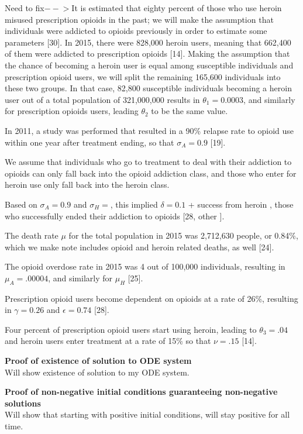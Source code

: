 \documentclass[12pt]{article}
\begin{document}
Need to fix$--$$>$It is estimated that eighty percent of those who use heroin misused prescription opioids in the past; we will make the assumption that individuals were addicted to opioids previously in order to estimate some parameters [30]. In 2015, there were 828,000 heroin users, meaning that 662,400 of them were addicted to prescription opioids [14]. Making the assumption that the chance of becoming a heroin user is equal among susceptible individuals and prescription opioid users, we will split the remaining 165,600 individuals into these two groups. In that case, 82,800 susceptible individuals becoming a heroin user out of a total population of 321,000,000 results in $\theta_{1}=0.0003$, and similarly for prescription opioids users, leading $\theta_{2}$ to be the same value. 


In 2011, a study was performed that resulted in a 90\% relapse rate to opioid use within one year after treatment ending, so that $\sigma_{A}=0.9$ [19]. 

We assume that individuals who go to treatment to deal with their addiction to opioids can only fall back into the opioid addiction class, and those who enter for heroin use only fall back into the heroin class. 

Based on $\sigma_{A}=0.9$ and $\sigma_{H}=$, this implied  $\delta=0.1$ + success from heroin , those who successfully ended their addiction to opioids [28, other ]. 

The death rate $\mu$ for the total population in 2015 was 2,712,630 people, or 0.84\%, which we make note includes opioid and heroin related deaths, as well [24]. 

The opioid overdose rate in 2015 was 4 out of 100,000 individuals, resulting in $\mu_A=.00004$, and similarly for $\mu_H$ [25]. 

Prescription opioid users become dependent on opioids at a rate of 26\%, resulting in $\gamma=0.26$ and $\epsilon=0.74$ [28].

Four percent of prescription opioid users start using heroin, leading to $\theta_3=.04$ and heroin users enter treatment at a rate of 15\% so that $\nu=.15$ [14]. 

 \textbf{Proof of existence of solution to ODE system} \\
Will show existence of solution to my ODE system. 


\textbf{Proof of non-negative initial conditions guaranteeing non-negative solutions} \\
 Will show that starting with positive initial conditions, will stay positive for all time.
\end{document}
